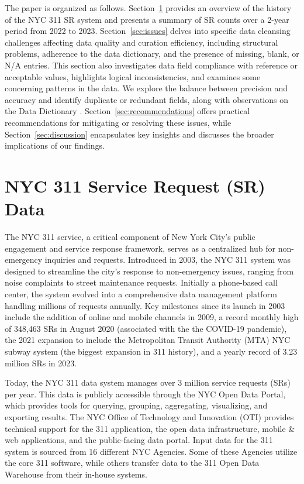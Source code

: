 \documentclass[linenumber]{jdsart}
\begin{document}
The paper is organized as follows. Section~\ref{sec:data} provides 
an overview of the history of the NYC 311 SR system and presents 
a summary of SR counts over a 2-year period from 2022 to 2023. 
Section~\ref{sec:issues} delves into specific data cleansing 
challenges affecting data quality and curation efficiency, 
including structural problems, adherence to the data dictionary, 
and the presence of missing, blank, or N/A entries. This section
 also investigates data field compliance with reference or acceptable values, 
highlights logical inconsistencies, and examines some concerning patterns 
in the data. We explore the balance between precision and accuracy 
and identify duplicate or redundant fields, along with observations 
on the Data Dictionary \citep{datadictionaryNYC}.
Section~\ref{sec:recommendations} offers 
practical recommendations for mitigating or resolving these issues, 
while Section~\ref{sec:discussion} encapsulates key insights and 
discusses the broader implications of our findings.


\section{NYC 311 Service Request (SR) Data} 
\label{sec:data}

The NYC 311 service, a critical component of New York City's public
engagement and service response framework, serves as a centralized hub
for non-emergency inquiries and requests. Introduced in 2003, the NYC
311 system was designed to streamline the city's response to
non-emergency issues, ranging from noise complaints to street
maintenance requests. Initially a phone-based call center, the system
evolved into a comprehensive data management platform handling
millions of requests annually. Key milestones since its launch in 2003
include the addition of online and mobile channels in 2009, a
record monthly high of 348,463 SRs in 
August 2020 (associated with the the COVID-19 
pandemic), the 2021 expansion to include the 
Metropolitan Transit Authority (MTA) NYC subway 
system (the biggest expansion in 311 history), 
and a yearly record of 3.23 million SRs in 2023.


Today, the NYC 311 data system manages over 3 million service
requests (SRs) per year. This data is publicly accessible 
through the NYC Open Data Portal, which provides 
tools for querying, grouping, aggregating,
visualizing, and exporting results. The NYC Office of Technology and Innovation (OTI) 
provides technical support for the 311 application, 
the open data infrastructure, mobile \& web applications, 
and the public-facing data portal. Input data for the 311 system 
is sourced from 16 different NYC Agencies. Some of these Agencies
utilize the core 311 software, while others transfer data to the
311 Open Data Warehouse from their in-house systems.
\end{document}
